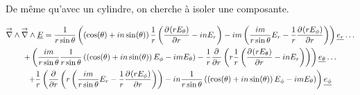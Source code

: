     De même qu'avec un cylindre, on cherche à isoler une composante.

    \begin{multline}
        \vrot \vrot \v{E} = \frac{1}{r\sin\theta}\left(\left(\cos(\theta) + in\sin(\theta)\right)\frac{1}{r}\left(\ddr{r}{(rE_\theta)}-inE_r\right) - im \left(\frac{im}{r\sin\theta}E_r - \frac{1}{r}\ddr{r}{(rE_\phi)} \right)\right)\v{e_r}\dots 
        \\
        + \left(\frac{im}{r\sin\theta}\frac{1}{r\sin\theta}\left(\left(\cos(\theta) + in\sin(\theta)\right)E_\phi - im E_\theta\right) - \frac{1}{r}\ddr{r}{}\left(r \frac{1}{r}\left(\ddr{r}{(rE_\theta)}-inE_r\right)\right) \right)\v{e_\theta} \dots
        \\
        + \frac{1}{r}\left(\ddr{r}{}\left(r \left(\frac{im}{r\sin\theta}E_r - \frac{1}{r}\ddr{r}{(rE_\phi)} \right)\right)-in\frac{1}{r\sin\theta}\left(\left(\cos(\theta) + in\sin(\theta)\right)E_\phi - im E_\theta\right)\right)\v{e_\phi}
    \end{multline}
